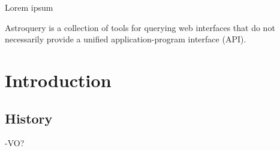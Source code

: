Lorem ipsum
\lipsum

Astroquery is a collection of tools for querying web interfaces that do not
necessarily provide a unified application-program interface (API).


\section{Introduction}
\subsection{History}
-VO?
